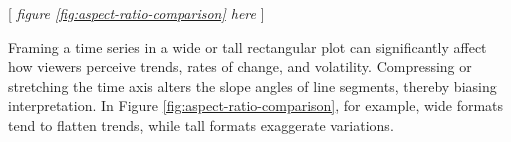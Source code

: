 \documentclass[11pt,twoside,a4paper]{article}
\begin{document}
\begin{center}
    [ \textit{figure \ref{fig:aspect-ratio-comparison}  here}  ]
\end{center}






Framing a time series in a wide or tall rectangular plot can significantly affect how viewers perceive trends, rates of change, and volatility. Compressing or stretching the time axis alters the slope angles of line segments, thereby biasing interpretation. In Figure \ref{fig:aspect-ratio-comparison}, for example, wide formats tend to flatten trends, while tall formats exaggerate variations. 
\end{document}

